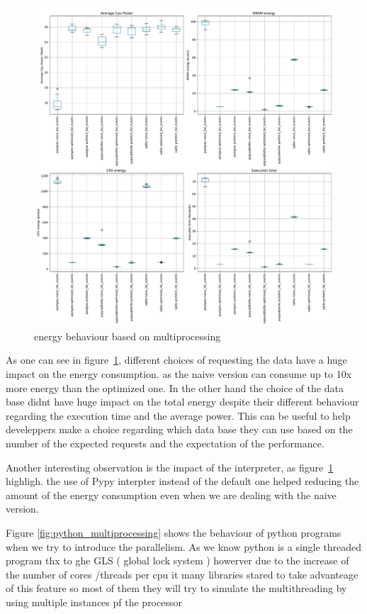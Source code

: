 \begin{figure}[!hbt]
    \centering
    \includegraphics[width=\linewidth]{imgs/django}
    \caption{energy behaviour based on multiprocessing}
    \label{fig:django}
\end{figure}



As one can see in figure~\ref{fig:django}, different choices of requesting the data have a huge impact on the energy consumption. as the naive version can consume up to 10x more energy than the optimized one.
In the other hand the choice of the data base didnt have huge impact on the total energy despite their different behaviour regarding the execution time and the average power.
This can be useful to help develeppers make a choice regarding which data base they can use based on the number of the expected requests and the expectation of the performance.

Another interesting observation is the impact of the interpreter, as figure~\ref{fig:django} highligh. the use of Pypy interpter instead of the default one helped reducing the amount of the energy consumption even when we are dealing with the naive version.

Figure \ref{fig:python_multiprocessing} shows the behaviour of python programs when we try to introduce the parallelism.
As we know python is a single threaded program thx to ghe GLS ( global lock system ) howerver due to the increase of the number of cores /threads per cpu it many libraries stared to take advanteage of this feature so most of them they will try to simulate the multithreading by using multiple instances pf the processor %

